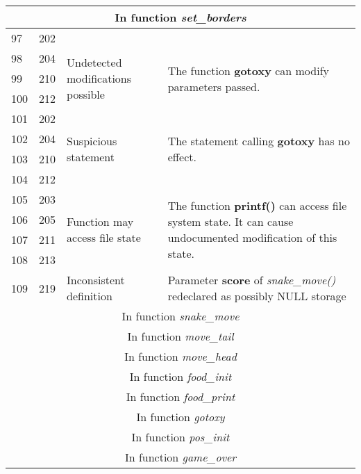 \documentclass[]{article}
\begin{document}
\begin{longtable}{ |p{0.5cm}|p{0.75cm}|p{3cm}|p{9cm}|  }
		\hline 
		\multicolumn{4}{|c|}{In function \textit{set\_borders}} \\
		\hline 
		
		97 & 202 & & \\
		98 & 204 & \multirow{3}{80.0pt}{Undetected modifications possible}  & \multirow{3}{200.0pt}{The function \textbf{gotoxy} can modify parameters passed.} \\
		99 & 210 & & \\
		100 & 212 & & \\
		\hline 
		101 & 202 &  \multirow{4}{50.0pt}{Suspicious statement} & \multirow{4}{200.0pt}{The statement calling \textbf{gotoxy} has no effect.} 
		\\
		102 & 204 & & \\
		103 & 210 & & \\
		104 & 212 & & \\
		\hline 
		105 & 203 &  \multirow{4}{80.0pt}{Function may access file state} & \multirow{4}{200.0pt}{The function \textbf{printf()} can access file system state. It can cause undocumented modification of this state.} 
		\\
		106 & 205 & & \\
		107 & 211 & & \\
		108 & 213 & & \\
		\hline 
		109 & 219 & Inconsistent definition & Parameter \textbf{score} of \textit{snake\_move()} redeclared as possibly NULL storage\\
		
		\hline 
		\multicolumn{4}{|c|}{In function \textit{snake\_move}} \\
		\hline 
		
		\hline 
		\multicolumn{4}{|c|}{In function \textit{move\_tail}} \\
		\hline 
		
		\hline 
		\multicolumn{4}{|c|}{In function \textit{move\_head}} \\
		\hline 
		
		\hline 
		\multicolumn{4}{|c|}{In function \textit{food\_init}} \\
		\hline 
		
		\hline 
		\multicolumn{4}{|c|}{In function \textit{food\_print}} \\
		\hline 
		
		\hline 
		\multicolumn{4}{|c|}{In function \textit{gotoxy}} \\
		\hline 
		
		\hline 
		\multicolumn{4}{|c|}{In function \textit{pos\_init}} \\
		\hline 
		
		\hline 
		\multicolumn{4}{|c|}{In function \textit{game\_over}} \\
		\hline 
 		
 		\hline 
 	\end{longtable} 
\end{document}
